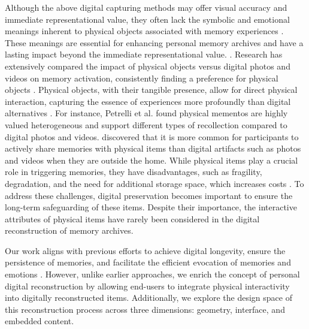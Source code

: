 Although the above digital capturing methods may offer visual accuracy and immediate representational value, they often lack the symbolic and emotional meanings inherent to physical objects associated with memory experiences \cite{petrelli2010family,kirk2010human,jones2018co}.
These meanings are essential for enhancing personal memory archives and have a lasting impact beyond the immediate representational value. \cite{bradley2014emotional,jones2018co,cushing2011self}. 
Research has extensively compared the impact of physical objects versus digital photos and videos on memory activation, consistently finding a preference for physical objects \cite{10.1145/2317956.2318054,petrelli2010family,10.1145/2470654.2466453}. 
Physical objects, with their tangible presence, allow for direct physical interaction, capturing the essence of experiences more profoundly than digital alternatives \cite{kirk2010human,nunes2009using,petrelli2014photo}.
For instance, Petrelli et al. \cite{petrelli2010family,petrelli2008autotopography} found physical mementos are highly valued heterogeneous and support different types of recollection compared to digital photos and videos.
\citet{10.1145/1031607.1031673} discovered that it is more common for participants to actively share memories with physical items than digital artifacts such as photos and videos when they are outside the home. 
While physical items play a crucial role in triggering memories, they have disadvantages, such as fragility, degradation, and the need for additional storage space, which increases costs \cite{kirk2010human}. 
To address these challenges, digital preservation becomes important to ensure the long-term safeguarding of these items. Despite their importance, the interactive attributes of physical items have rarely been considered in the digital reconstruction of memory archives.

Our work aligns with previous efforts to achieve digital longevity, ensure the persistence of memories, and facilitate the efficient evocation of memories and emotions \cite{duranti2012memory}. 
However, unlike earlier approaches, we enrich the concept of personal digital reconstruction by allowing end-users to integrate physical interactivity into digitally reconstructed items. Additionally, we explore the design space of this reconstruction process across three dimensions: geometry, interface, and embedded content.




